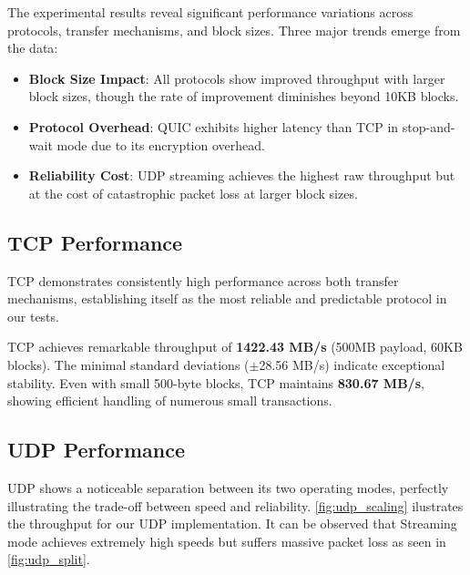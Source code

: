 \documentclass[12pt,a4paper]{article}
\begin{document}
The experimental results reveal significant performance variations across protocols, transfer mechanisms, and block sizes. Three major trends emerge from the data:

\begin{itemize}
    \item \textbf{Block Size Impact}: All protocols show improved throughput with larger block sizes, though the rate of improvement diminishes beyond 10KB blocks.
    \item \textbf{Protocol Overhead}: QUIC exhibits higher latency than TCP in stop-and-wait mode due to its encryption overhead.
    \item \textbf{Reliability Cost}: UDP streaming achieves the highest raw throughput but at the cost of catastrophic packet loss at larger block sizes.
\end{itemize}

\subsection{TCP Performance}

TCP demonstrates consistently high performance across both transfer mechanisms, establishing itself as the most reliable and predictable protocol in our tests.

TCP achieves remarkable throughput of \textbf{1422.43 MB/s} (500MB payload, 60KB blocks). The minimal standard deviations ($\pm$28.56 MB/s) indicate exceptional stability. Even with small 500-byte blocks, TCP maintains \textbf{830.67 MB/s}, showing efficient handling of numerous small transactions.

\subsection{UDP Performance}


UDP shows a noticeable separation between its two operating modes, perfectly illustrating the trade-off between speed and reliability. \autoref{fig:udp_scaling} ilustrates the throughput for our UDP implementation. It can be observed that Streaming mode achieves extremely high speeds but suffers massive packet loss as seen in \autoref{fig:udp_split}.
\end{document}
